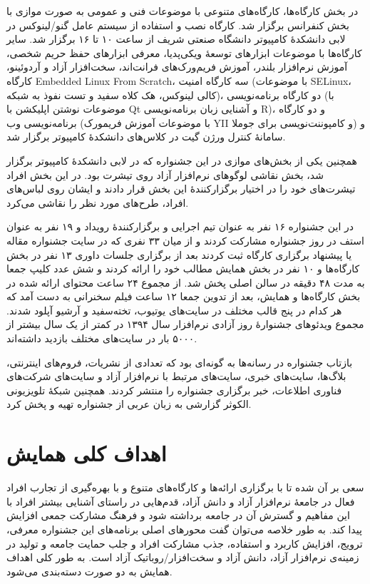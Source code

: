 \documentclass{article}
\begin{document}
در بخش کارگاه‌ها، کارگاه‌های متنوعی با موضوعات فنی و عمومی به صورت موازی با بخش کنفرانس برگزار شد. کارگاه نصب و استفاده از سیستم عامل گنو/لینوکس در لابی دانشکدهٔ کامپیوتر دانشگاه صنعتی شریف از ساعت ۱۰ تا ۱۶ برگزار شد. سایر کارگاه‌ها با موضوعات ابزارهای توسعهٔ ویکی‌پدیا، معرفی ابزارهای حفظ حریم شخصی، آموزش نرم‌افزار بلندر، آموزش فریم‌ورک‌های فرانت‌اند، سخت‌افزار آزاد و آردوئینو،  کارگاه Embedded Linux From Scratch، سه کارگاه امنیت (با موضوعات SELinux، کالی لینوکس، هک کلاه سفید و تست نفوذ به شبکه)،  دو کارگاه برنامه‌نویسی (با موضوعات نوشتن اپلیکشن با Qt و آشنایی زبان برنامه‌نویسی R)، و دو کارگاه برنامه‌نویسی وب (با موضوعات آموزش فریمورک YII و کامپوننت‌نویسی برای جوملا) و سامانهٔ کنترل ورژن گیت در کلاس‌های دانشکدهٔ کامپیوتر برگزار شد.

همچنین یکی از بخش‌های موازی در این جشنواره که در لابی دانشکدهٔ کامپیوتر برگزار شد، بخش نقاشی لوگوهای نرم‌افزار آزاد روی تیشرت بود. در این بخش افراد تیشرت‌های خود را در اختیار برگزارکنندهٔ این بخش قرار دادند و ایشان روی لباس‌های افراد، طرح‌های مورد نظر را نقاشی می‌کرد.

در این جشنواره ۱۶ نفر به عنوان تیم اجرایی و برگزارکنندهٔ رویداد و ۱۹ نفر به عنوان استف در روز جشنواره مشارکت کردند و از میان ۳۳ نفری که در سایت جشنواره مقاله یا پیشنهاد برگزاری کارگاه ثبت کردند بعد از برگزاری جلسات داوری ۱۳ نفر در بخش کارگاه‌ها و ۱۰ نفر در بخش همایش مطالب خود را ارائه کردند و شش عدد کلیپ جمعا به مدت ۴۸ دقیقه در سالن اصلی پخش شد. از مجموع ۲۴ ساعت محتوای ارائه شده در بخش کارگاه‌ها و همایش، بعد از تدوین جمعا ۱۲ ساعت فیلم سخنرانی به دست آمد که هر کدام در پنج قالب مختلف در سایت‌های یوتیوب، تخته‌سفید و آرشیو آپلود شدند. مجموع ویدئوهای جشنوارهٔ روز آزادی نرم‌افزار سال ۱۳۹۴ در کمتر از یک سال بیشتر از ۵۰۰۰ بار در سایت‌های مختلف بازدید داشته‌اند.

بازتاب جشنواره در رسانه‌ها به گونه‌ای بود که تعدادی از نشریات، فروم‌های اینترنتی، بلاگ‌ها، سایت‌های خبری، سایت‌های مرتبط با نرم‌افزار آزاد و سایت‌های شرکت‌های فناوری اطلاعات، خبر برگزاری جشنواره را منتشر کردند. همچنین شبکهٔ تلویزیونی الکوثر گزارشی به زبان عربی از جشنواره تهیه و پخش کرد.

\section{اهداف کلی همایش}
سعی بر آن شده تا با برگزاری ارائه‌ها و کارگاه‌های متنوع و با بهره‌گیری از تجارب افراد فعال در جامعهٔ نرم‌افزار آزاد و دانش آزاد، قدم‌هایی در راستای آشنایی بیشتر افراد با این مفاهیم و گسترش آن در جامعه برداشته شود و فرهنگ مشارکت جمعی افزایش پیدا کند. به طور خلاصه می‌توان گفت محورهای اصلی برنامه‌های این جشنواره معرفی، ترویج، افزایش کاربرد و استفاده، جذب مشارکت افراد و جلب حمایت جامعه و تولید در زمینه‌ی نرم‌افزار آزاد، دانش آزاد و سخت‌افزار/روباتیک آزاد است. به طور کلی اهداف همایش به دو صورت دسته‌بندی می‌شود.
\end{document}
